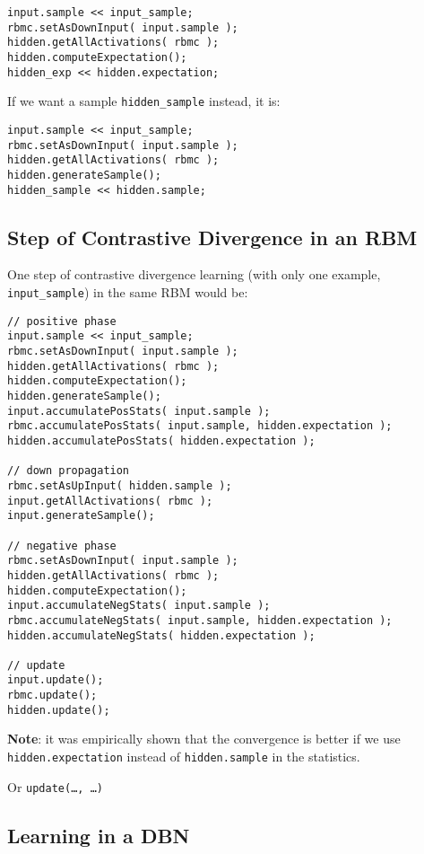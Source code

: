 \documentclass[11pt]{book}
\begin{document}
\begin{verbatim}
input.sample << input_sample;
rbmc.setAsDownInput( input.sample );
hidden.getAllActivations( rbmc );
hidden.computeExpectation();
hidden_exp << hidden.expectation;
\end{verbatim}

If we want a sample {\tt hidden\_sample} instead, it is:

\begin{verbatim}
input.sample << input_sample;
rbmc.setAsDownInput( input.sample );
hidden.getAllActivations( rbmc );
hidden.generateSample();
hidden_sample << hidden.sample;
\end{verbatim}

\subsection{Step of Contrastive Divergence in an RBM}

One step of contrastive divergence learning (with only one example, {\tt
input\_sample}) in the same RBM would be:

\begin{verbatim}
// positive phase
input.sample << input_sample;
rbmc.setAsDownInput( input.sample );
hidden.getAllActivations( rbmc );
hidden.computeExpectation();
hidden.generateSample();
input.accumulatePosStats( input.sample );
rbmc.accumulatePosStats( input.sample, hidden.expectation );
hidden.accumulatePosStats( hidden.expectation );

// down propagation
rbmc.setAsUpInput( hidden.sample );
input.getAllActivations( rbmc );
input.generateSample();

// negative phase
rbmc.setAsDownInput( input.sample );
hidden.getAllActivations( rbmc );
hidden.computeExpectation();
input.accumulateNegStats( input.sample );
rbmc.accumulateNegStats( input.sample, hidden.expectation );
hidden.accumulateNegStats( hidden.expectation );

// update
input.update();
rbmc.update();
hidden.update();
\end{verbatim}

{\bf Note}: it was empirically shown that the convergence is better if we
use {\tt hidden.expectation} instead of {\tt hidden.sample} in the
statistics.

Or {\tt update(\ldots, \ldots)}

\subsection{Learning in a DBN}
\end{document}
